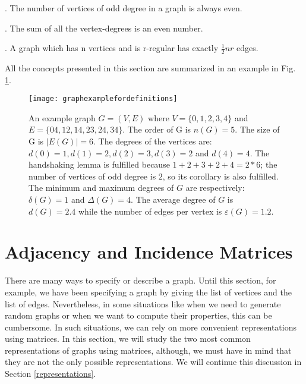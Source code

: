 \begin{corollary}
	\cite{diestel}. The number of vertices of odd degree in a graph is always even.
\end{corollary}

\begin{corollary}
	\cite{wilsonwatkins}. The sum of all the vertex-degrees is an even number.
\end{corollary}

\begin{corollary}
	\cite{wilsonwatkins}. A graph which has n vertices and is r-regular has exactly $ \frac{1}{2} nr$ edges.
	\label{handshaking_corollary}
\end{corollary}

All the concepts presented in this section are summarized in an example in Fig. \ref{fig:definitions}.

\begin{figure}[h]
\centering
\texttt{[image: graphexamplefordefinitions]}
\caption[Basic definitions for a graph.]{An example graph $G=(V,E)$ where $V=\{0,1,2,3,4\}$ and $E=\{04,12,14,23,24,34\}$. The order of G is $n(G)=5$. The size of G is $|E(G)|=6$. The degrees of the vertices are: $d(0)=1, d(1)=2, d(2)=3, d(3)=2$ and $d(4)=4$. The handshaking lemma is fulfilled because $1+2+3+2+4=2 \ast 6$; the number of vertices of odd degree is $2$, so its corollary is also fulfilled. The minimum and maximum degrees of $G$ are respectively: $\delta (G)=1$ and $ \Delta (G)=4$. The average degree of $G$ is $d(G)=2.4$ while the number of edges per vertex is $ \varepsilon (G)=1.2$.}
\label{fig:definitions}
\end{figure}

\section{Adjacency and Incidence Matrices}
There are many ways to specify or describe a graph. Until this section, for example, we have been specifying a graph by giving the list of vertices and the list of edges. Nevertheless, in some situations like when we need to generate random graphs or when we want to compute their properties, this can be cumbersome. In such situations, we can rely on more convenient representations using matrices. In this section, we will study the two most common representations of graphs using matrices, although, we must have in mind that they are not the only possible representations. We will continue this discussion in Section \ref{representations}.

